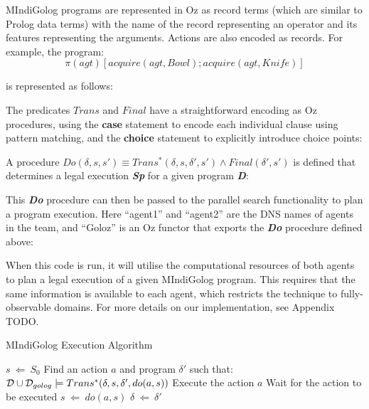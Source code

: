 MIndiGolog programs are represented in Oz as record terms (which are
similar to Prolog data terms) with the name of the record representing
an operator and its features representing the arguments. Actions are
also encoded as records. For example, the program:\[
\pi(agt)\left[acquire(agt,Bowl);acquire(agt,Knife)\right]\]


is represented as follows:


The predicates $Trans$ and $Final$ have a straightforward encoding
as Oz procedures, using the \textbf{case} statement to encode each
individual clause using pattern matching, and the \textbf{choice}
statement to explicitly introduce choice points:



A procedure $Do(\delta,s,s')\equiv Trans^{*}(\delta,s,\delta',s')\wedge Final(\delta',s')$
is defined that determines a legal execution \textbf{\emph{Sp}} for
a given program \textbf{\emph{D}}:


This \textbf{\emph{Do}} procedure can then be passed to the parallel
search functionality to plan a program execution. Here {}``agent1''
and {}``agent2'' are the DNS names of agents in the team, and {}``Goloz''
is an Oz functor that exports the \textbf{\emph{Do}} procedure defined
above:


When this code is run, it will utilise the computational resources
of both agents to plan a legal execution of a given MIndiGolog program.
This requires that the same information is available to each agent,
which restricts the technique to fully-observable domains. For more
details on our implementation, see Appendix TODO.

\begin{algorithm}[t]
\caption{MIndiGolog Execution Algorithm}
\label{alg:mindigolog_exec}
\begin{algorithmic}
\STATE $s\ \Leftarrow\ S_0$
  \STATE Find an action $a$ and program $\delta'$ such that: $\mathcal{D} \cup \mathcal{D}_{golog} \models Trans^*(\delta,s,\delta',do(a,s))$
    \STATE Execute the action $a$
  \ELSE
    \STATE Wait for the action to be executed
  \ENDIF
  \STATE $s\ \Leftarrow\ do(a,s)$ 
  \STATE $\delta\ \Leftarrow\ \delta'$
\ENDWHILE
\end{algorithmic} 
\end{algorithm}

